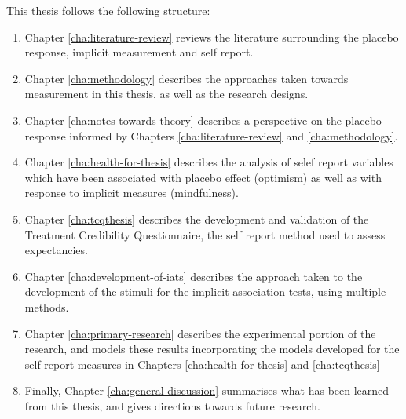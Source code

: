 This thesis follows the following structure:

\begin{enumerate}
\item Chapter \ref{cha:literature-review} reviews the literature surrounding the placebo response, implicit measurement and self report. 
\item Chapter \ref{cha:methodology} describes the approaches taken towards measurement in this thesis, as well as the research designs.
\item Chapter \ref{cha:notes-towards-theory} describes a perspective on the placebo response informed by Chapters \ref{cha:literature-review} and \ref{cha:methodology}.
\item Chapter \ref{cha:health-for-thesis} describes the analysis of selef report variables which have been associated with placebo effect (optimism) as well as with response to implicit measures (mindfulness). 
\item Chapter \ref{cha:tcqthesis} describes the development and validation of the Treatment Credibility Questionnaire, the self report method used to assess expectancies.
\item Chapter \ref{cha:development-of-iats} describes the approach taken to the development of the stimuli for the implicit association tests, using multiple methods. 
\item Chapter \ref{cha:primary-research} describes the experimental portion of the research, and models these results incorporating the models developed for the self report measures in Chapters \ref{cha:health-for-thesis} and \ref{cha:tcqthesis}
\item Finally, Chapter \ref{cha:general-discussion} summarises what has been learned from this thesis, and gives directions towards future research.

\end{enumerate}





